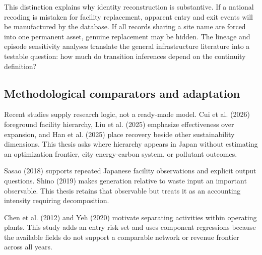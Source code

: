 \documentclass[12pt,a4paper]{article}
\begin{document}
This distinction explains why identity reconstruction is substantive. If a
national recoding is mistaken for facility replacement, apparent entry and exit
events will be manufactured by the database. If all records sharing a site name
are forced into one permanent asset, genuine replacement may be hidden. The
lineage and episode sensitivity analyses translate the general infrastructure
literature into a testable question: how much do transition inferences depend on
the continuity definition?

\subsection{Methodological comparators and adaptation}

Recent studies supply research logic, not a ready-made model. Cui et al.
(2026) foreground facility hierarchy, Liu et al. (2025) emphasize effectiveness
over expansion, and Han et al. (2025) place recovery beside other sustainability
dimensions. This thesis asks where hierarchy appears in Japan without estimating
an optimization frontier, city energy-carbon system, or pollutant outcomes.

Sasao (2018) supports repeated Japanese facility observations and explicit
output questions. Shino (2019) makes generation relative to waste input an
important observable. This thesis retains that observable but treats it as an
accounting intensity requiring decomposition.

Chen et al. (2012) and Yeh (2020) motivate separating activities within
operating plants. This study adds an entry risk set and uses component
regressions because the available fields do not support a comparable network or
revenue frontier across all years.
\end{document}
